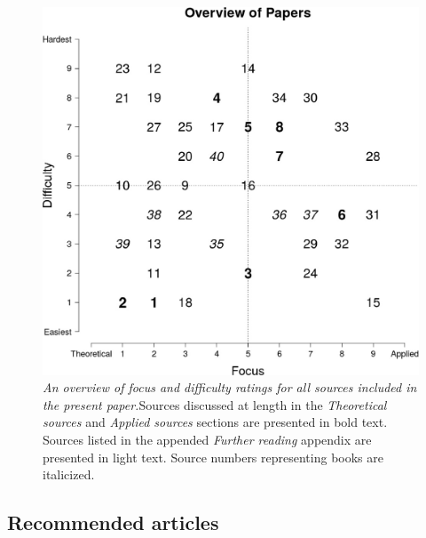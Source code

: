 \begin{figure}[!t]
\centering
  \includegraphics[width=\textwidth]{figs/8st_figureA1_overviewOfPapers}
  \caption{\emph{An overview of focus and difficulty ratings for all sources included in the present paper.}Sources discussed at length in the \emph{Theoretical sources} and \emph{Applied sources} sections are presented in bold text. Sources listed in the appended \emph{Further reading} appendix are presented in light text.  Source numbers representing books are italicized.} 
  \label{fig:8st:scatter}
  
\end{figure}


\subsection*{Recommended articles}

